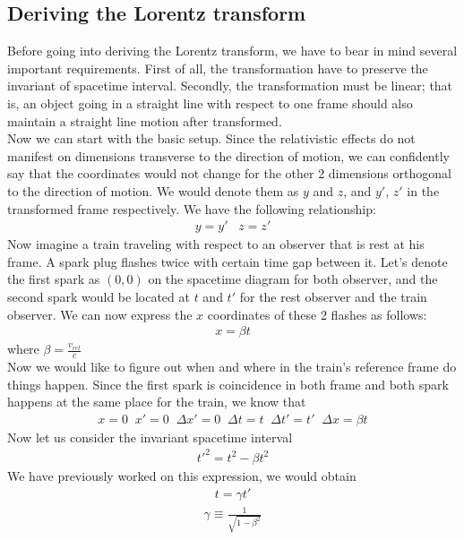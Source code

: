 \documentclass[12pt]{book}
\begin{document}
\subsection{Deriving the Lorentz transform}
Before going into deriving the Lorentz transform, we have to bear in mind several important requirements. First of all, the transformation have to preserve the invariant of spacetime interval. Secondly, the transformation must be linear; that is, an object going in a straight line with respect to one frame should also maintain a straight line motion after transformed. \\
\newline
Now we can start with the basic setup. Since the relativistic effects do not manifest on dimensions transverse to the direction of motion, we can confidently say that the coordinates would not change for the other 2 dimensions orthogonal to the direction of motion. We would denote them as $y$ and $z$, and $y'$, $z'$ in the transformed frame respectively. We have the following relationship:
\begin{align}
y=y' \;\;\; z=z'
\end{align}
Now imagine a train traveling with respect to an observer that is rest at his frame. A spark plug flashes twice with certain time gap between it. Let's denote the first spark as $(0,0)$ on the spacetime diagram for both observer, and the second spark would be located at $t$ and $t'$ for the rest observer and the train observer. We can now express the $x$ coordinates of these 2 flashes as follows:
\begin{align}
x=\beta t
\end{align}
where $\beta = \frac{v_{rel}}{c}$\\
\newline
Now we would like to figure out when and where in the train's reference frame do things happen. Since the first spark is coincidence in both frame and both spark happens at the same place for the train, we know that
\begin{align}
x=0 \;\; x'=0 \;\; \Delta x' = 0 \;\; \Delta t = t \;\; \Delta t' = t' \;\; \Delta x = \beta t
\end{align}
Now let us consider the invariant spacetime interval
\begin{align}
t'^2=t^2-\beta t^2
\end{align}
We have previously worked on this expression, we would obtain
\begin{align}
t=\gamma t'
\end{align}
\begin{align}
\gamma \equiv \frac{1}{\sqrt{1-\beta ^2}}
\end{align}
\end{document}
